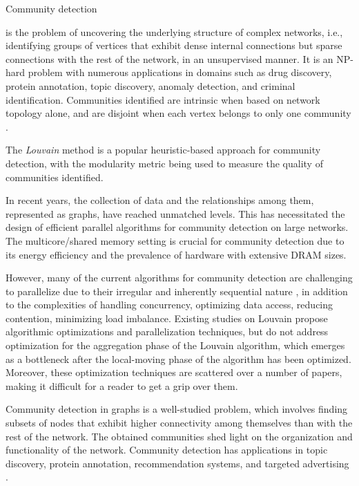 Community detection is the problem of uncovering the underlying structure of complex networks, i.e., identifying groups of vertices that exhibit dense internal connections but sparse connections with the rest of the network, in an unsupervised manner. It is an NP-hard problem with numerous applications in domains such as drug discovery, protein annotation, topic discovery, anomaly detection, and criminal identification. Communities identified are intrinsic when based on network topology alone, and are disjoint when each vertex belongs to only one community \cite{com-gregory10}. The \textit{Louvain} method \cite{com-blondel08} is a popular heuristic-based approach for community detection, with the modularity metric \cite{com-newman06} being used to measure the quality of communities identified.

In recent years, the collection of data and the relationships among them, represented as graphs, have reached unmatched levels. This has necessitated the design of efficient parallel algorithms for community detection on large networks. The multicore/shared memory setting is crucial for community detection due to its energy efficiency and the prevalence of hardware with extensive DRAM sizes. However, many of the current algorithms for community detection are challenging to parallelize due to their irregular and inherently sequential nature \cite{com-halappanavar17}, in addition to the complexities of handling concurrency, optimizing data access, reducing contention, minimizing load imbalance. Existing studies on Louvain propose algorithmic optimizations and parallelization techniques, but do not address optimization for the aggregation phase of the Louvain algorithm, which emerges as a bottleneck after the local-moving phase of the algorithm has been optimized. Moreover, these optimization techniques are scattered over a number of papers, making it difficult for a reader to get a grip over them.


Community detection in graphs is a well-studied problem, which involves finding subsets of nodes that exhibit higher connectivity among themselves than with the rest of the network. The obtained communities shed light on the organization and functionality of the network. Community detection has applications in topic discovery, protein annotation, recommendation systems, and targeted advertising \cite{com-gregory10}.

